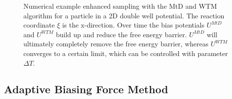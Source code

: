 \begin{figure}[H]
    \centering
    \caption{Numerical example enhanced sampling with the MtD and WTM algorithm for a particle in a 2D double well potential. The reaction coordinate $\xi$ is the x-direction. Over time the bias potentials $U^{MtD}$ and $U^{WTM}$ build up and reduce the free energy barrier. $U^{MtD}$ will ultimately completely remove the free energy barrier, whereas $U^{WTM}$ converges to a certain limit, which can be controlled with parameter $\Delta T$. }
\label{fig:metaD}%
\end{figure}

\newpage
\subsection{Adaptive Biasing Force Method}
\label{sec:ABF}

